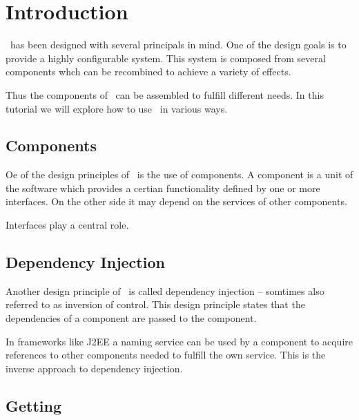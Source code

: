 
\chapter{Introduction}

\ExTeX\ has been designed with  several principals in mind. One of the
design goals is to provide a highly configurable system. This system
is composed from several components whch can be recombined to achieve
a variety of effects.

Thus the components of \ExTeX\ can be assembled to fulfill different
needs. In this tutorial we will explore how to use \ExTeX\ in various
ways.

\section{Components}

Oe of the design principles of \ExTeX\ is the use of components. A
component is a unit of the software which provides a certian
functionality defined by one or more interfaces. On the other side it
may depend on the services of other components.

Interfaces play a central role.

\section{Dependency Injection}

Another design principle of \ExTeX\ is called dependency injection --
somtimes also referred to as inversion of control. This design
principle states that the dependencies of a component are passed to
the component.

In frameworks like J2EE a naming service can be used by a component to
acquire references to other components needed to fulfill the own
service. This is the inverse approach to dependency injection.


\section{Getting \ExTeX}




%
